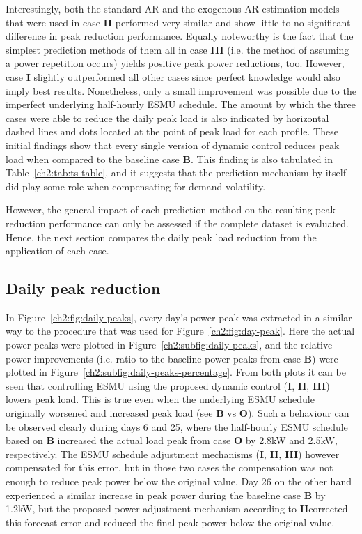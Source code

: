 Interestingly, both the standard AR and the exogenous AR estimation models that were used in case \textbf{II} performed very similar and show little to no significant difference in peak reduction performance.
Equally noteworthy is the fact that the simplest prediction methods of them all in case \textbf{III} (i.e. the method of assuming a power repetition occurs) yields positive peak power reductions, too.
However, case \textbf{I} slightly outperformed all other cases since perfect knowledge would also imply best results.
Nonetheless, only a small improvement was possible due to the imperfect underlying half-hourly ESMU schedule.
The amount by which the three cases were able to reduce the daily peak load is also indicated by horizontal dashed lines and dots located at the point of peak load for each profile.
These initial findings show that every single version of dynamic control reduces peak load when compared to the baseline case \textbf{B}.
This finding is also tabulated in Table~\ref{ch2:tab:ts-table}, and it suggests that the prediction mechanism by itself did play some role when compensating for demand volatility.



However, the general impact of each prediction method on the resulting peak reduction performance can only be assessed if the complete dataset is evaluated.
Hence, the next section compares the daily peak load reduction from the application of each case.

\subsection{Daily peak reduction}



In Figure~\ref{ch2:fig:daily-peaks}, every day's power peak was extracted in a similar way to the procedure that was used for Figure~\ref{ch2:fig:day-peak}.
Here the actual power peaks were plotted in Figure~\ref{ch2:subfig:daily-peaks}, and the relative power improvements (i.e. ratio to the baseline power peaks from case \textbf{B}) were plotted in Figure~\ref{ch2:subfig:daily-peaks-percentage}.
From both plots it can be seen that controlling ESMU using the proposed dynamic control (\textbf{I}, \textbf{II}, \textbf{III}) lowers peak load.
This is true even when the underlying ESMU schedule originally worsened and increased peak load (see \textbf{B} vs \textbf{O}).
Such a behaviour can be observed clearly during days 6 and 25, where the half-hourly ESMU schedule based on \textbf{B} increased the actual load peak from case \textbf{O} by 2.8kW and 2.5kW, respectively.
The ESMU schedule adjustment mechanisms (\textbf{I}, \textbf{II}, \textbf{III}) however compensated for this error, but in those two cases the compensation was not enough to reduce peak power below the original value.
Day 26 on the other hand experienced a similar increase in peak power during the baseline case \textbf{B} by 1.2kW, but the proposed power adjustment mechanism according to \textbf{II}corrected this forecast error and reduced the final peak power below the original value.

